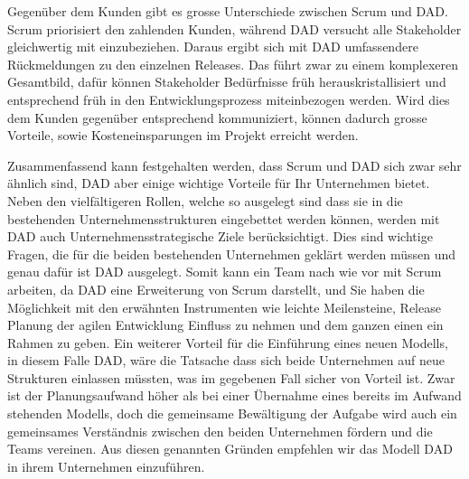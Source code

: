 Gegenüber dem Kunden gibt es grosse Unterschiede zwischen Scrum und DAD. Scrum priorisiert den zahlenden Kunden, während DAD versucht alle Stakeholder gleichwertig mit einzubeziehen. Daraus ergibt sich mit DAD umfassendere Rückmeldungen zu den einzelnen Releases. Das führt zwar zu einem komplexeren Gesamtbild, dafür können Stakeholder Bedürfnisse früh herauskristallisiert und entsprechend früh in den Entwicklungsprozess miteinbezogen werden. Wird dies dem Kunden gegenüber entsprechend kommuniziert, können dadurch grosse Vorteile, sowie Kosteneinsparungen im Projekt erreicht werden. 

Zusammenfassend kann festgehalten werden, dass Scrum und DAD sich zwar sehr ähnlich sind, DAD aber einige wichtige Vorteile für Ihr Unternehmen bietet. Neben den vielfältigeren Rollen, welche so ausgelegt sind dass sie in die bestehenden Unternehmensstrukturen eingebettet werden können, werden mit DAD auch Unternehmensstrategische Ziele berücksichtigt. Dies sind wichtige Fragen, die für die beiden bestehenden Unternehmen geklärt werden müssen und genau dafür ist DAD ausgelegt. Somit kann ein Team nach wie vor mit Scrum arbeiten, da DAD eine Erweiterung von Scrum darstellt,  und Sie haben die Möglichkeit mit den erwähnten Instrumenten wie leichte Meilensteine, Release Planung der agilen Entwicklung Einfluss zu nehmen und dem ganzen einen ein Rahmen zu geben.\newline
Ein weiterer Vorteil für die Einführung eines neuen Modells, in diesem Falle DAD, wäre die Tatsache dass sich beide Unternehmen auf neue Strukturen einlassen müssten, was im gegebenen Fall sicher von Vorteil ist. Zwar ist der Planungsaufwand höher als bei einer Übernahme eines bereits im Aufwand stehenden Modells, doch die gemeinsame Bewältigung der Aufgabe wird auch ein gemeinsames Verständnis zwischen den beiden Unternehmen fördern und die Teams vereinen. Aus diesen genannten Gründen empfehlen wir das Modell DAD in ihrem Unternehmen einzuführen.





	